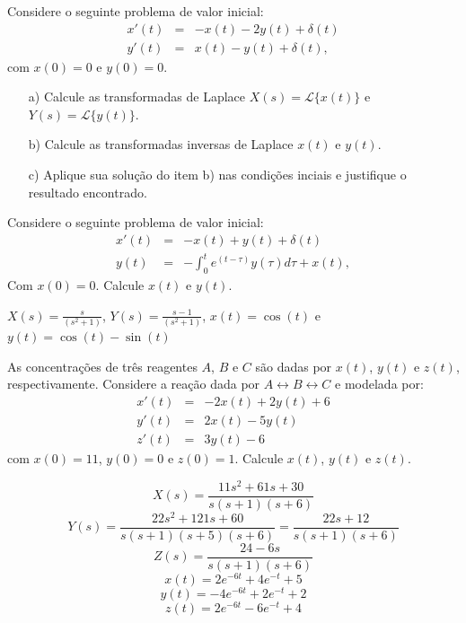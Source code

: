 \begin{exer}
Considere o seguinte problema de valor inicial:
 \begin{eqnarray*}
x'(t)&=&- x(t) -2 y(t)+\delta(t)\\
y'(t)&=& x(t) - y(t)+\delta(t),
\end{eqnarray*}
com $x(0)=0$ e $y(0)=0$.
\begin{itemize}
       
 \item[a)] Calcule as transformadas de Laplace $X(s)=\mathcal{L}\{x(t)\}$ e $Y(s)=\mathcal{L}\{y(t)\}$.
 \item[b)] Calcule as transformadas inversas de Laplace $x(t)$ e $y(t)$.
 \item[c)] Aplique sua solução do item b) nas condições inciais e justifique o resultado encontrado.
\end{itemize}
\end{exer}

\begin{exer} Considere o seguinte problema de valor inicial:
\begin{eqnarray*}
      x'(t)&=&-x(t)+ y(t)+\delta(t) \\
      y(t)&=& -\int_0^t e^{(t-\tau)} y(\tau)d\tau+x(t),
\end{eqnarray*}
Com $x(0)=0$. Calcule $x(t)$ e $y(t)$.
\end{exer}
\begin{resp}
 $X(s)=\frac{s}{\left(s^2+1\right)}$, $Y(s)=\frac{s-1}{\left(s^2+1\right)}$, $x(t)=\cos(t)$ e $y(t)=\cos(t)-\sin(t)$
\end{resp}

\begin{exer}As concentrações de três reagentes $A$, $B$ e $C$ são dadas por $x(t)$, $y(t)$ e $z(t)$, respectivamente. Considere a reação dada por $A \longleftrightarrow B \longleftrightarrow C$ e modelada por:
\begin{eqnarray*}
       x'(t) &=& -2 x(t) + 2 y(t)+6\\
       y'(t) &=& 2 x(t) - 5 y(t)\\
       z'(t) &=& 3  y(t)-6
\end{eqnarray*}
com $x(0)=11$, $y(0)=0$ e $z(0)=1$. Calcule $x(t)$, $y(t)$ e $z(t)$.
\end{exer}

\begin{resp}
$$X(s)=\frac{11s^2+61s+30}{s(s+1)(s+6)}$$
$$Y(s)=\frac{22s^2+121s+60}{s(s+1)(s+5)(s+6)}=\frac{22 s + 12}{s (s + 1) (s + 6)}$$
$$Z(s)=\frac{24-6s}{s(s+1)(s+6)}$$
$$x(t)= 2 e^{-6 t} + 4 e^{-t} + 5$$
$$y(t) = -4 e^{-6 t} + 2e^{-t} + 2$$
$$z(t) = 2 e^{-6 t} -6e^{-t} + 4$$
\end{resp}
       
